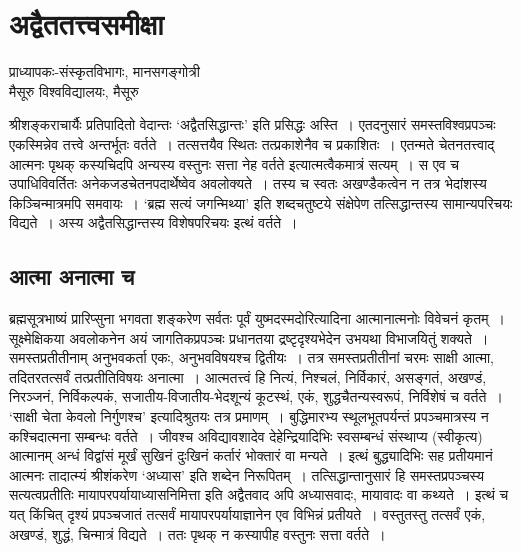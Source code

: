 {\fontsize{15}{17}\selectfont
\presetvalues
\chapter{अद्वैततत्त्वसमीक्षा}

\begin{center}
\smallskip

प्राध्यापकः-संस्कृतविभागः, मानसगङ्गोत्री\\
मैसूरु विश्वविद्यालयः, मैसूरु
\addrule
\end{center}
श्रीशङ्कराचार्यैः प्रतिपादितो वेदान्तः ‘अद्वैतसिद्धान्तः’ इति प्रसिद्धः अस्ति~। एतदनुसारं समस्तविश्वप्रपञ्चः एकस्मिन्नेव तत्त्वे अन्तर्भूतः वर्तते~। तत्सत्तयैव स्थितः तत्प्रकाशेनैव च प्रकाशितः~। एतन्मते चेतनतत्त्वाद् आत्मनः पृथक् कस्यचिदपि अन्यस्य वस्तुनः सत्ता नेह वर्तते इत्यात्मत्वैकमात्रं सत्यम्~। स एव च उपाधिविवर्तितः अनेकजडचेतनपदार्थेष्वेव अवलोक्यते~। तस्य च स्वतः अखण्डैकत्वेन न तत्र भेदांशस्य किञ्चिन्मात्रमपि समवायः~। ‘ब्रह्म सत्यं जगन्मिथ्या’ इति शब्दचतुष्टये संक्षेपेण तत्सिद्धान्तस्य सामान्यपरिचयः विद्यते~। अस्य अद्वैतसिद्धान्तस्य विशेषपरिचयः इत्थं वर्तते~। 

\section*{आत्मा अनात्मा च}

ब्रह्मसूत्रभाष्यं प्रारिप्सुना भगवता शङ्करेण सर्वतः पूर्वं युष्मदस्मदोरित्यादिना आत्मानात्मनोः विवेचनं कृतम्~। सूक्ष्मेक्षिकया अवलोकनेन अयं जागतिकप्रपञ्चः प्रधानतया द्रष्टृदृश्यभेदेन उभयथा विभाजयितुं शक्यते~। समस्तप्रतीतीनाम् अनुभवकर्ता एकः, अनुभवविषयश्च द्वितीयः~। तत्र समस्तप्रतीतीनां चरमः साक्षी आत्मा, तदितरतत्सर्वं तत्प्रतीतिविषयः अनात्मा~। आत्मतत्त्वं हि नित्यं, निश्चलं, निर्विकारं, असङ्गतं, अखण्डं, निरञ्जनं, निर्विकल्पकं, सजातीय-विजातीय-भेदशून्यं कूटस्थं, एकं, शुद्धचैतन्यस्वरूपं, निर्विशेषं च वर्तते~। ‘साक्षी चेता केवलो निर्गुणश्च’ इत्यादिश्रुतयः तत्र प्रमाणम्~। बुद्धिमारभ्य स्थूलभूतपर्यन्तं प्रपञ्चमात्रस्य न कश्चिदात्मना सम्बन्धः वर्तते~। जीवश्च अविद्यावशादेव देहेन्द्रियादिभिः स्वसम्बन्धं संस्थाप्य (स्वीकृत्य) आत्मानम् अन्धं विद्वांसं मूर्खं सुखिनं दुःखिनं कर्तारं भोक्तारं वा मन्यते~। इत्थं बुद्ध्यादिभिः सह प्रतीयमानं आत्मनः तादात्म्यं श्रीशंकरेण ‘अध्यास’ इति शब्देन निरूपितम्~। तत्सिद्धान्तानुसारं हि समस्तप्रपञ्चस्य सत्यत्वप्रतीतिः मायापरपर्यायाध्यासनिमित्ता इति अद्वैतवाद अपि अध्यासवादः, मायावादः वा कथ्यते~। इत्थं च यत् किंचित् दृश्यं प्रपञ्चजातं तत्सर्वं मायापरपर्यायाज्ञानेन एव विभिन्नं प्रतीयते~। वस्तुतस्तु तत्सर्वं एकं, अखण्डं, शुद्धं, चिन्मात्रं विद्यते~। ततः पृथक् न कस्यापीह वस्तुनः सत्ता वर्तते~। 

}
